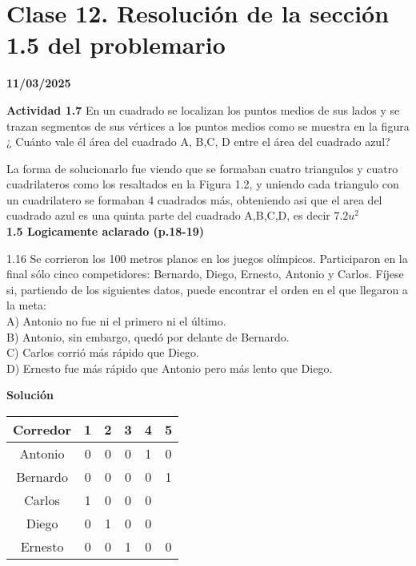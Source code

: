 \section{Clase 12. Resolución de la sección 1.5 del problemario}
\textbf{11/03/2025}

\textbf{Actividad 1.7}
En un cuadrado se localizan los puntos medios de sus lados y se trazan segmentos de sus vértices a los puntos medios como se muestra en la figura
¿ Cuánto vale él área del cuadrado A, B,C, D entre el área
del cuadrado azul?\bigskip
\par
\begin{minipage}[c]{0.48\textwidth}
    \centering
    
\end{minipage}
\begin{minipage}[c]{0.48\textwidth}
    \centering
    
\end{minipage}
\par

La forma de solucionarlo fue viendo que se formaban cuatro triangulos y cuatro cuadrilateros como los resaltados en la Figura 1.2, y uniendo cada triangulo con un cuadrilatero se formaban 4 cuadrados más, obteniendo asi que el area del cuadrado azul es una quinta parte del cuadrado A,B,C,D, es decir $7.2 u^{2}$
\\
\textbf{1.5 Logicamente aclarado (p.18-19)}
\begin{excercise}
1.16 Se corrieron los 100 metros planos en los juegos olímpicos. Participaron en la final sólo cinco competidores: Bernardo, Diego, Ernesto, Antonio y Carlos. Fíjese si, partiendo de los siguientes datos, puede encontrar el orden en el que llegaron a la meta:
\\ A) Antonio no fue ni el primero ni el último.
\\ B) Antonio, sin embargo, quedó por delante de Bernardo.
\\ C) Carlos corrió más rápido que Diego.
\\ D) Ernesto fue más rápido que Antonio pero más lento que Diego.
\end{excercise}

\textbf{Solución}
\begin{center}
    \begin{tabular}{c|c|c|c|c|c}
        Corredor & 1 & 2 & 3 & 4 & 5\\ \hline
        Antonio &0&0&0&1&0 \\ \hline
        Bernardo &0&0&0&0&1 \\ \hline
        Carlos &1&0&0&0& \\ \hline
        Diego &0&1&0&0& \\ \hline
        Ernesto &0&0&1&0&0 \\ \hline
    \end{tabular}
\end{center}

